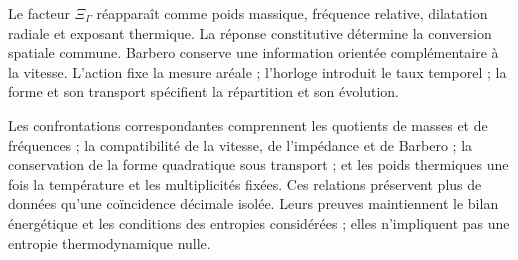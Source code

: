 Le facteur $\Xi_\Gamma$ réapparaît comme poids massique, fréquence relative,
dilatation radiale et exposant thermique. La réponse constitutive détermine
la conversion spatiale commune. Barbero conserve une information orientée
complémentaire à la vitesse. L’action fixe la mesure aréale ; l’horloge
introduit le taux temporel ; la forme et son transport spécifient la répartition
et son évolution.

Les confrontations correspondantes comprennent les quotients de masses et de fréquences ;
la compatibilité de la vitesse, de l’impédance et de Barbero ; la conservation de la forme
quadratique sous transport ; et les poids thermiques une fois la température et les
multiplicités fixées. Ces relations préservent plus de données qu’une coïncidence
décimale isolée. Leurs preuves maintiennent le bilan énergétique et les
conditions des entropies considérées ; elles n’impliquent pas une entropie
thermodynamique nulle.
